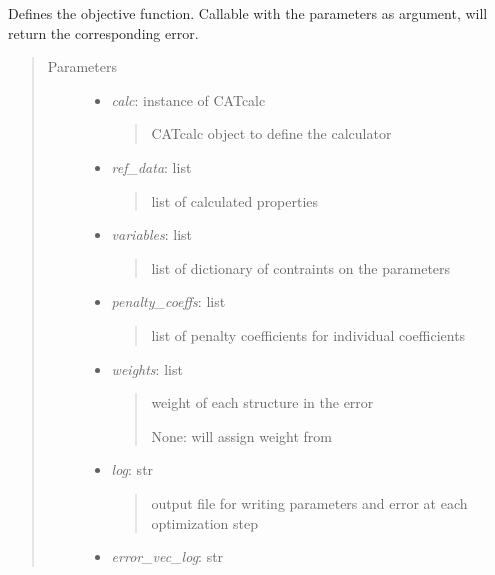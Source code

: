 \documentclass[letterpaper,10pt,english]{sphinxmanual}
\begin{document}
\begin{fulllineitems}
\label{classes:catkernel.CATobjective}
Defines the objective function. Callable with the parameters as argument, 
will return the corresponding error.
\begin{quote}\begin{description}
\item[{Parameters}] \leavevmode\begin{itemize}
\item {} 
\emph{calc}: instance of CATcalc
\begin{quote}

CATcalc object to define the calculator
\end{quote}

\item {} 
\emph{ref\_data}: list
\begin{quote}

list of calculated properties
\end{quote}

\item {} 
\emph{variables}: list
\begin{quote}

list of dictionary of contraints on the parameters
\end{quote}

\item {} 
\emph{penalty\_coeffs}: list
\begin{quote}

list of penalty coefficients for individual coefficients
\end{quote}

\item {} 
\emph{weights}: list
\begin{quote}

weight of each structure in the error

None: will assign weight from 
\end{quote}

\item {} 
\emph{log}: str
\begin{quote}

output file for writing parameters and error at each optimization
step
\end{quote}

\item {} 
\emph{error\_vec\_log}: str
\begin{quote}


\end{quote}
\end{itemize}
\end{description}
\end{quote}
\end{fulllineitems}
\end{document}
